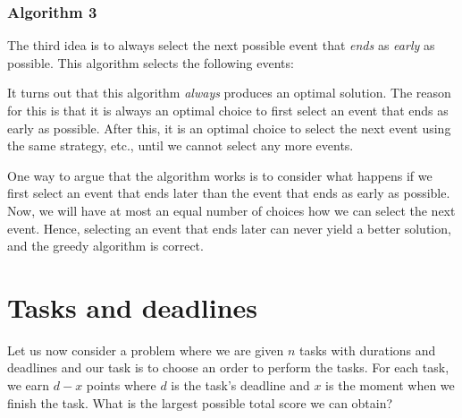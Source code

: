 \subsubsection*{Algorithm 3}

The third idea is to always select the next
possible event that \emph{ends} as \emph{early} as possible.
This algorithm selects the following events: 
\begin{center}
\end{center}

It turns out that this algorithm
\emph{always} produces an optimal solution.
The reason for this is that it is always an optimal choice
to first select an event that ends
as early as possible.
After this, it is an optimal choice
to select the next event
using the same strategy, etc.,
until we cannot select any more events.

One way to argue that the algorithm works
is to consider
what happens if we first select an event
that ends later than the event that ends
as early as possible.
Now, we will have at most an equal number of
choices how we can select the next event.
Hence, selecting an event that ends later
can never yield a better solution,
and the greedy algorithm is correct.

\section{Tasks and deadlines}

Let us now consider a problem where
we are given $n$ tasks with durations and deadlines
and our task is to choose an order to perform the tasks.
For each task, we earn $d-x$ points
where $d$ is the task's deadline
and $x$ is the moment when we finish the task.
What is the largest possible total score
we can obtain?

